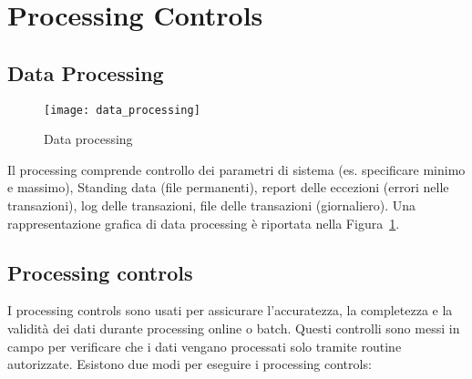 \section{Processing Controls}

\subsection{Data Processing}

\begin{figure}[h!]
        \begin{center}
                \texttt{[image: data\_processing]}
        \end{center}
        \caption{Data processing}
        \label{fig:data:processing}
\end{figure}

Il processing comprende controllo dei parametri di sistema (es. specificare
minimo e massimo), Standing data (file permanenti), report delle eccezioni
(errori nelle transazioni), log delle transazioni, file delle transazioni
(giornaliero). Una rappresentazione grafica di data processing è riportata
nella Figura~\ref{fig:data:processing}.

\subsection{Processing controls}
I processing controls sono usati per assicurare
l'accuratezza, la completezza e la validità dei dati durante
processing online o batch. Questi controlli sono messi in campo
per verificare che i dati vengano processati solo tramite routine
autorizzate. Esistono due modi per eseguire i processing controls:

